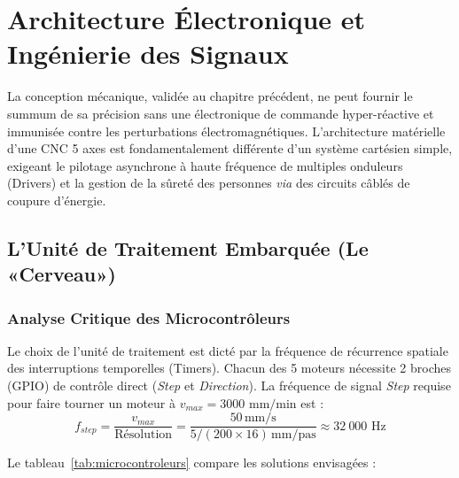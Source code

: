 \chapter{Architecture Électronique et Ingénierie des Signaux}
\label{chap:mechatronics}

La conception mécanique, validée au chapitre précédent, ne peut fournir le summum de sa précision sans une électronique de commande hyper-réactive et immunisée contre les perturbations électromagnétiques. L'architecture matérielle d'une CNC 5 axes est fondamentalement différente d'un système cartésien simple, exigeant le pilotage asynchrone à haute fréquence de multiples onduleurs (Drivers) et la gestion de la sûreté des personnes \textit{via} des circuits câblés de coupure d'énergie.

\section{L'Unité de Traitement Embarquée (Le «Cerveau»)}

\subsection{Analyse Critique des Microcontrôleurs}
Le choix de l'unité de traitement est dicté par la fréquence de récurrence spatiale des interruptions temporelles (Timers).
Chacun des 5 moteurs nécessite 2 broches (GPIO) de contrôle direct (\textit{Step} et \textit{Direction}).
La fréquence de signal \textit{Step} requise pour faire tourner un moteur à $v_{max} = 3000 \text{ mm/min}$ est :
\begin{equation}
    f_{step} = \frac{v_{max}}{\text{Résolution}} = \frac{50\,\text{mm/s}}{5/(200 \times 16)\,\text{mm/pas}} \approx \boxed{32~000 \text{ Hz}}
\end{equation}

Le tableau~\ref{tab:microcontroleurs} compare les solutions envisagées :

